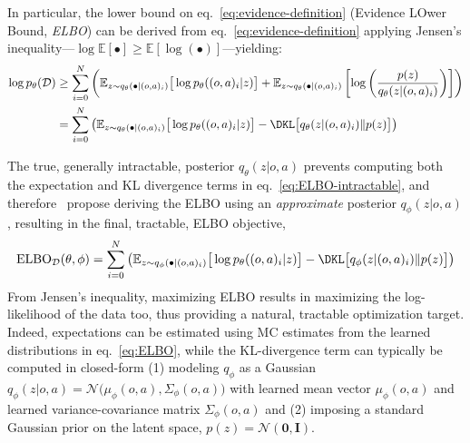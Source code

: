 In particular, the lower bound on eq.~\ref{eq:evidence-definition} (Evidence LOwer Bound, \emph{ELBO}) can be derived from eq.~\ref{eq:evidence-definition} applying Jensen's inequality---\(\log \mathbb{E}[\bullet] \geq \mathbb{E} [\log (\bullet)] \)---yielding:
\begin{align}
    \log p_\theta(\mathcal D) &\geq \sum_{i=0}^{N} \left(
            \mathbb{E}_{z \sim q_\theta(\bullet \vert (o,a)_i)} \big[ \log p_\theta((o,a)_i \vert z) \big]
            + \mathbb{E}_{z \sim q_\theta(\bullet \vert (o,a)_i)} \left[ \log \left( \frac{p(z)}{q_\theta(z \vert (o,a)_i)} \right) \right]
        \right) \\
        &= \sum_{i=0}^{N} \left(
            \mathbb{E}_{z \sim q_\theta(\bullet \vert (o,a)_i)} \big[ \log p_\theta((o,a)_i \vert z) \big]
        - \DKL \big[ q_\theta(z \vert (o,a)_i) \Vert p(z) \big]
        \right) \label{eq:ELBO-intractable}
\end{align}

The true, generally intractable, posterior \( q_\theta (z \vert o,a) \) prevents computing both the expectation and KL divergence terms in eq.~\ref{eq:ELBO-intractable}, and therefore~\citet{kingmaAutoEncodingVariationalBayes2022} propose deriving the ELBO using an \emph{approximate} posterior \( q_\phi(z \vert o,a) \), resulting in the final, tractable, ELBO objective,
\begin{align}
\text{ELBO}_{\mathcal D}(\theta, \phi) = \sum_{i=0}^{N} \left(
            \mathbb{E}_{z \sim q_\phi(\bullet \vert (o,a)_i)} \big[ \log p_\theta((o,a)_i \vert z) \big]
        - \DKL \big[ q_\phi(z \vert (o,a)_i) \Vert p(z) \big]
        \right)
        \label{eq:ELBO}
\end{align}
From Jensen's inequality, maximizing ELBO results in maximizing the log-likelihood of the data too, thus providing a natural, tractable optimization target.
Indeed, expectations can be estimated using MC estimates from the learned distributions in eq.~\ref{eq:ELBO}, while the KL-divergence term can typically be computed in closed-form (1) modeling  \(q_\phi \) as a Gaussian \(q_\phi(z \vert o,a) = \mathcal N\big(\mu_\phi(o,a), \Sigma_\phi(o,a) \big) \) with learned mean vector \( \mu_\phi(o,a) \) and learned variance-covariance matrix \( \Sigma_\phi(o,a) \) and (2) imposing a standard Gaussian prior on the latent space, \( p(z) = \mathcal N(\mathbf{0}, \mathbf{I}) \).

